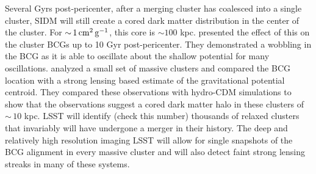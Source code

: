 Several Gyrs post-pericenter, after a merging cluster has coalesced into a single cluster, SIDM will still create a cored dark matter distribution in the center of the cluster. For $ {\sim}\, 1 \mathrm{\,cm}^{2} \mathrm{\,g}^{-1}$, this core is $\sim 100$ kpc. \citet{1608.08630} presented the effect of this on the cluster BCGs up to 10 Gyr post-pericenter. They demonstrated a wobbling in the BCG as it is able to oscillate about the shallow potential for many oscillations. \citet{1703.07365} analyzed a small set of massive clusters and compared the BCG location with a strong lensing based estimate of the gravitational potential centroid. They compared these observations with hydro-CDM simulations to show that the observations suggest a cored dark matter halo in these clusters of $\sim\,10$ kpc. LSST will identify (check this number) thousands of relaxed clusters that invariably will have undergone a merger in their history. The deep and relatively high resolution imaging LSST will allow for single snapshots of the BCG alignment in every massive cluster and will also detect faint strong lensing streaks in many of these systems.




